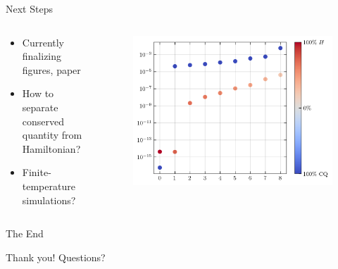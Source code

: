 \documentclass{beamer}
\begin{document}
\begin{frame}{Next Steps}
	\begin{columns}
	\begin{column}{0.4\textwidth}
		\begin{itemize}
		\item<+-> Currently finalizing figures, paper 
		\item<+-> How to separate conserved quantity from Hamiltonian? 
		\item<+-> Finite-temperature simulations?
		\end{itemize}
	\end{column}
	\begin{column}{0.6\textwidth}
		\begin{figure}[h]
			\centering
			\includegraphics[width=1\textwidth]{figs/cons_quantity_vs_h.png}
		\end{figure}
	\end{column}
	\end{columns}
\end{frame}

\begin{frame}{The End}
\begin{center}
\LARGE Thank you! Questions?
\end{center}
\end{frame}
\end{document}
